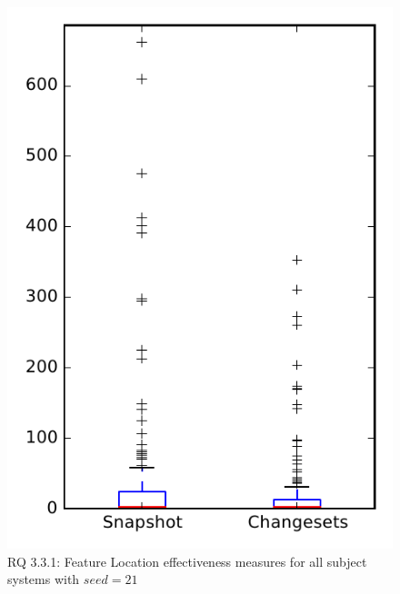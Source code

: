 
\begin{figure}
\centering
\includegraphics[height=0.4\textheight]{figures/flt_seed/rq1_overview_21}
\caption{RQ 3.3.1: Feature Location effectiveness measures for all subject systems with $seed=21$}
\label{fig:flt_seed:rq1:overview}
\end{figure}
